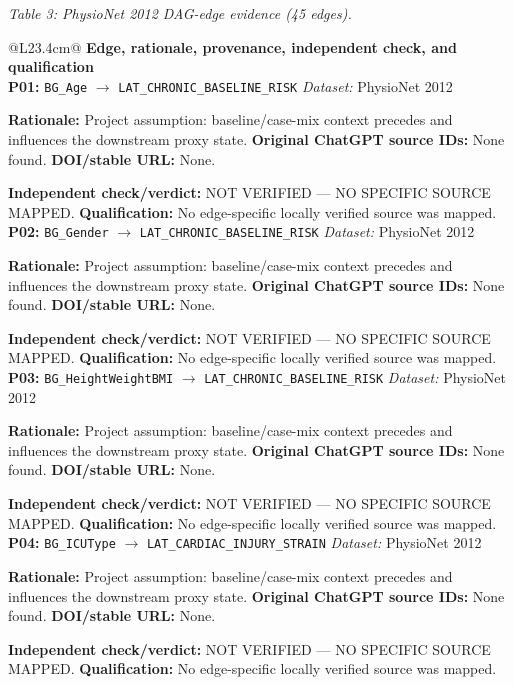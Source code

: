 \begin{center}\textit{Table 3: PhysioNet 2012 DAG-edge evidence (45 edges).}\end{center}
\begin{tabular}{@{}L{23.4cm}@{}}
\toprule
\textbf{Edge, rationale, provenance, independent check, and qualification}\\
\midrule
\textbf{P01:} \nolinkurl{BG_Age} $\rightarrow$ \nolinkurl{LAT_CHRONIC_BASELINE_RISK} \hfill \textit{Dataset:} PhysioNet 2012\par\textbf{Rationale:} Project assumption: baseline/case-mix context precedes and influences the downstream proxy state. \textbf{Original ChatGPT source IDs:} None found. \textbf{DOI/stable URL:} None.\par\textbf{Independent check/verdict:} NOT VERIFIED --- NO SPECIFIC SOURCE MAPPED. \textbf{Qualification:} No edge-specific locally verified source was mapped. \\
\addlinespace[2pt]
\midrule
\textbf{P02:} \nolinkurl{BG_Gender} $\rightarrow$ \nolinkurl{LAT_CHRONIC_BASELINE_RISK} \hfill \textit{Dataset:} PhysioNet 2012\par\textbf{Rationale:} Project assumption: baseline/case-mix context precedes and influences the downstream proxy state. \textbf{Original ChatGPT source IDs:} None found. \textbf{DOI/stable URL:} None.\par\textbf{Independent check/verdict:} NOT VERIFIED --- NO SPECIFIC SOURCE MAPPED. \textbf{Qualification:} No edge-specific locally verified source was mapped. \\
\addlinespace[2pt]
\midrule
\textbf{P03:} \nolinkurl{BG_HeightWeightBMI} $\rightarrow$ \nolinkurl{LAT_CHRONIC_BASELINE_RISK} \hfill \textit{Dataset:} PhysioNet 2012\par\textbf{Rationale:} Project assumption: baseline/case-mix context precedes and influences the downstream proxy state. \textbf{Original ChatGPT source IDs:} None found. \textbf{DOI/stable URL:} None.\par\textbf{Independent check/verdict:} NOT VERIFIED --- NO SPECIFIC SOURCE MAPPED. \textbf{Qualification:} No edge-specific locally verified source was mapped. \\
\addlinespace[2pt]
\midrule
\textbf{P04:} \nolinkurl{BG_ICUType} $\rightarrow$ \nolinkurl{LAT_CARDIAC_INJURY_STRAIN} \hfill \textit{Dataset:} PhysioNet 2012\par\textbf{Rationale:} Project assumption: baseline/case-mix context precedes and influences the downstream proxy state. \textbf{Original ChatGPT source IDs:} None found. \textbf{DOI/stable URL:} None.\par\textbf{Independent check/verdict:} NOT VERIFIED --- NO SPECIFIC SOURCE MAPPED. \textbf{Qualification:} No edge-specific locally verified source was mapped. \\

\end{tabular}
